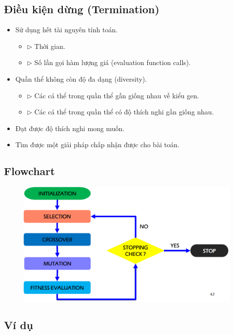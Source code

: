 \documentclass{book}
\begin{document}
\subsection{Điều kiện dừng (Termination)}

\begin{itemize}
    \item Sử dụng hết tài nguyên tính toán.
    \begin{itemize}
        \item[] $\triangleright$ Thời gian.
        \item[] $\triangleright$ Số lần gọi hàm lượng giá (evaluation function calls).
    \end{itemize}
    \item Quần thể không còn độ đa dạng (diversity).
    \begin{itemize}
        \item[] $\triangleright$ Các cá thể trong quần thể gần giống nhau về kiểu gen.
        \item[] $\triangleright$ Các cá thể trong quần thể có độ thích nghi gần giống nhau.
    \end{itemize}
    \item Đạt được độ thích nghi mong muốn.
    \item Tìm được một giải pháp chấp nhận được cho bài toán.
\end{itemize}

\subsection{Flowchart}
\begin{figure}[H]
    \centering
    \includegraphics[width=0.75\linewidth]{images/flowchart.png}
\end{figure}

\subsection{Ví dụ}
\end{document}
